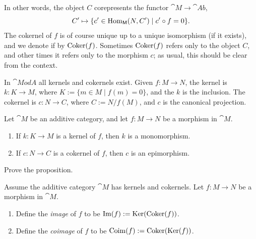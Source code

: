 In other words, the object $C$ corepresents the functor 
$\cat{M} \to \cat{Ab}$, 
\[ C' \mapsto \{ c' \in \operatorname{Hom}_{\operatorname{\mathsf{M}}}(N, C') \mid c' \circ f = 0 \} . \]
The cokernel of $f$ is of course unique up to a unique isomorphism (if it
exists), and we denote if by $\operatorname{Coker}(f)$. Sometimes $\operatorname{Coker}(f)$ 
refers only to the object $C$, and other times it refers only to the morphism
$c$; as usual, this should be clear from the context.

\begin{exa}
In $\cat{Mod} A$ all kernels and cokernels exist. 
Given $f : M \to N$, the kernel is 
$k : K \to M$, where 
$K := \{ m \in M \mid f(m) = 0 \}$,
and the $k$ is the inclusion. The cokernel is $c : N \to C$, where 
$C := N / f(M)$, and $c$ is the canonical projection.
\end{exa}

\begin{prop}
Let  $\cat{M}$ be an additive category, and let $f : M \to N$ be a morphism 
in $\cat{M}$.
\begin{enumerate}
\item If $k : K \to M$ is a kernel of $f$, then $k$  is a monomorphism.
\item If $c : N \to C$ is a cokernel of $f$, then $c$ is an epimorphism.
\end{enumerate}
\end{prop}

\begin{exer} 
Prove the proposition.
\end{exer}

\begin{dfn}
Assume the additive category $\cat{M}$ has kernels and cokernels. 
Let $f : M \to N$ be a morphism in $\cat{M}$.
\begin{enumerate}
\item Define the {\em image} of $f$ to be 
$\operatorname{Im}(f) := \operatorname{Ker}(\operatorname{Coker}(f))$.

\item Define the {\em coimage} of $f$ to be 
$\operatorname{Coim}(f) := \operatorname{Coker}(\operatorname{Ker}(f))$.
\end{enumerate}
\end{dfn}

